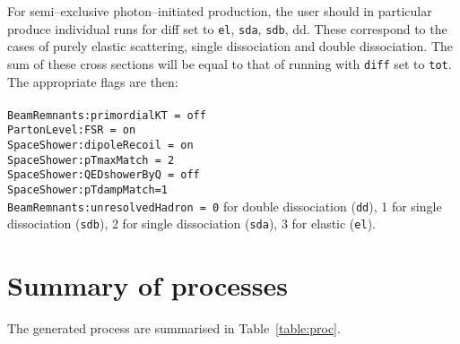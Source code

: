 \documentclass[12pt]{article}
\begin{document}
 For semi--exclusive photon--initiated production, the user should in particular produce individual runs for diff set to \texttt{el}, \texttt{sda}, \texttt{sdb}, dd. These correspond to the cases of purely elastic scattering, single dissociation and double dissociation. The sum of these cross sections will be equal to that of running with \texttt{diff} set to \texttt{tot}. The appropriate flags are then:
 \\
\\
\texttt{BeamRemnants:primordialKT = off}\\
\texttt{PartonLevel:FSR = on}\\
\texttt{SpaceShower:dipoleRecoil = on} \\
\texttt{SpaceShower:pTmaxMatch = 2} \\
\texttt{SpaceShower:QEDshowerByQ = off} \\
\texttt{SpaceShower:pTdampMatch=1} \\
\texttt{BeamRemnants:unresolvedHadron = 0} for double dissociation (\texttt{dd}), 1 for single dissociation (\texttt{sdb}), 2 for single dissociation (\texttt{sda}), 3 for elastic (\texttt{el}). \\

\section{Summary of processes}\label{sec:proc}

The generated process are summarised in Table~\ref{table:proc}.
\end{document}

